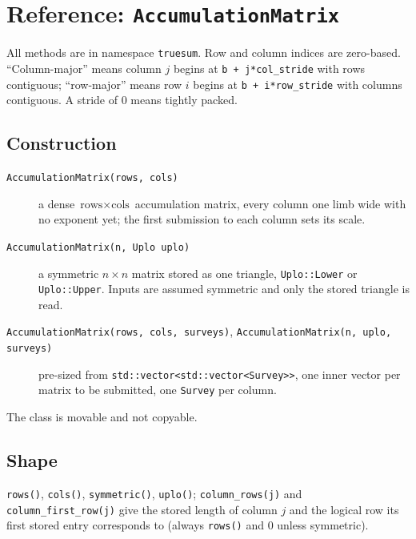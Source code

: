 \documentclass[11pt]{article}
\newcommand{\code}[1]{\texttt{#1}}
\begin{document}
\section{Reference: \code{AccumulationMatrix}}

All methods are in namespace \code{truesum}. Row and column indices are zero-based. ``Column-major'' means column $j$ begins at \code{b + j*col\_stride} with rows contiguous; ``row-major'' means row $i$ begins at \code{b + i*row\_stride} with columns contiguous. A stride of 0 means tightly packed.

\subsection{Construction}
\begin{description}
\item[\code{AccumulationMatrix(rows, cols)}] a dense $\text{rows} \times \text{cols}$ accumulation matrix, every column one limb wide with no exponent yet; the first submission to each column sets its scale.
\item[\code{AccumulationMatrix(n, Uplo uplo)}] a symmetric $n \times n$ matrix stored as one triangle, \code{Uplo::Lower} or \code{Uplo::Upper}. Inputs are assumed symmetric and only the stored triangle is read.
\item[\code{AccumulationMatrix(rows, cols, surveys)}, \code{AccumulationMatrix(n, uplo, surveys)}] pre-sized from \code{std::vector<std::vector<Survey>>}, one inner vector per matrix to be submitted, one \code{Survey} per column.
\end{description}
The class is movable and not copyable.

\subsection{Shape}
\code{rows()}, \code{cols()}, \code{symmetric()}, \code{uplo()}; \code{column\_rows(j)} and \code{column\_first\_row(j)} give the stored length of column $j$ and the logical row its first stored entry corresponds to (always \code{rows()} and 0 unless symmetric).
\end{document}
